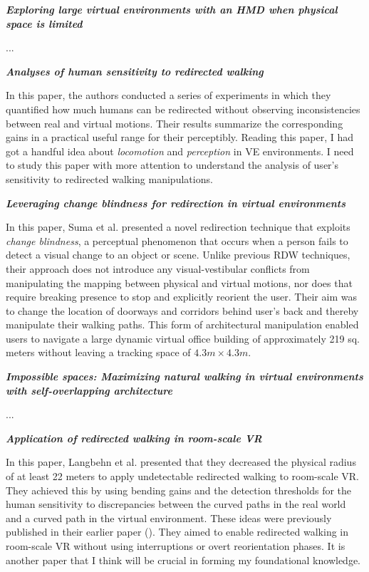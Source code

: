 \documentclass[12pt]{article}
\begin{document}
\noindent
\textbf{\cite{williams2007exploring} \emph{Exploring large virtual environments with an HMD when physical space is limited}}

...

\noindent
\textbf{\cite{steinicke2008analyses} \emph{Analyses of human sensitivity to redirected walking}}

In this paper, the authors conducted a series of experiments in which they quantified how much humans can be redirected without observing inconsistencies between real and virtual motions. Their results summarize the corresponding gains in a practical useful range for their perceptibly. Reading this paper, I had got a handful idea about \emph{locomotion} and \emph{perception} in VE environments. I need to study this paper with more attention to understand the analysis of user's sensitivity to redirected walking manipulations.

\noindent
\textbf{\cite{suma2011leveraging} \emph{Leveraging change blindness for redirection in virtual environments}}

In this paper, Suma et al. presented a novel redirection technique that exploits \emph{change blindness}, a perceptual phenomenon that occurs when a person fails to detect a visual change to an object or scene. Unlike previous RDW techniques, their approach does not introduce any visual-vestibular conflicts from manipulating the mapping between physical and virtual motions, nor does that require breaking presence to stop and explicitly reorient the user. Their aim was to change the location of doorways and corridors behind user's back and thereby manipulate their walking paths. This form of architectural manipulation enabled users to navigate a large dynamic virtual office building of approximately 219 sq. meters without leaving a tracking space of $4.3m \times 4.3m$.

\noindent
\textbf{\cite{suma2012impossible} \emph{Impossible spaces: Maximizing natural walking in virtual environments with self-overlapping architecture}}

...

\noindent
\textbf{\cite{langbehn2017application} \emph{Application of redirected walking in room-scale VR}}

In this paper, Langbehn et al. presented that they decreased the physical radius of at least 22 meters to apply undetectable redirected walking to room-scale VR. They achieved this by using bending gains and the detection thresholds for the human sensitivity to discrepancies between the curved paths in the real world and a curved path in the virtual environment. These ideas were previously published in their earlier paper (\cite{langbehn2017bending}). They aimed to enable redirected walking in room-scale VR without using interruptions or overt reorientation phases. It is another paper that I think will be crucial in forming my foundational knowledge.
\end{document}
